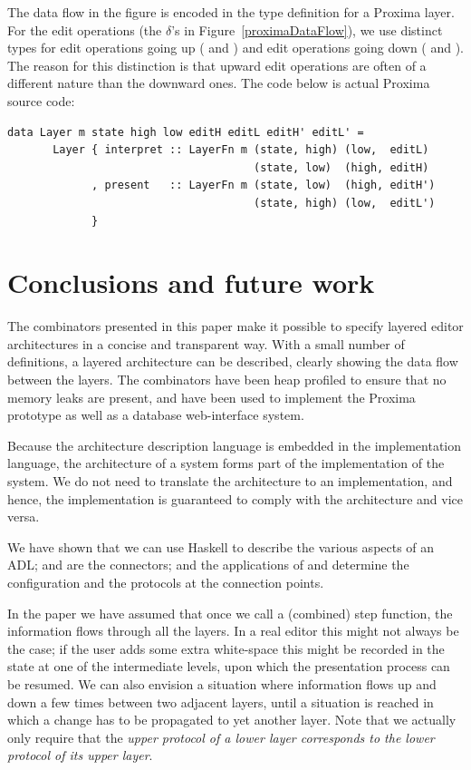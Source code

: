 \documentclass{llncs}
\begin{document}
The data flow in the figure is encoded in the type definition for a Proxima layer. For the edit operations (the $\delta$'s in Figure~\ref{proximaDataFlow}), we use distinct types for edit operations going up ( and ) and edit operations going down ( and ). The reason for this distinction is that upward edit operations are often of a different nature than the downward ones. The code below is actual Proxima source code:

\begin{small}
\begin{verbatim}
data Layer m state high low editH editL editH' editL' =
       Layer { interpret :: LayerFn m (state, high) (low,  editL)
                                      (state, low)  (high, editH)
             , present   :: LayerFn m (state, low)  (high, editH')
                                      (state, high) (low,  editL')
             }
\end{verbatim}
\end{small}


\section{Conclusions and future work} \label{sect:conclusions}

The combinators presented in this paper make it possible to specify layered editor architectures in a concise and transparent way. With a small number of definitions, a layered architecture can be described, clearly showing the data flow between the layers. The combinators have been heap profiled to ensure that no memory leaks are present, and have been used to implement the Proxima prototype as well as a database web-interface system.

Because the architecture description language is embedded in the implementation language, the architecture of a system forms part of the implementation of the system. We do not need to translate the architecture to an implementation, and hence, the implementation is guaranteed to comply with the architecture and vice versa.

We have shown that we can use Haskell to describe the various aspects of an ADL;  and  are the connectors; and the applications of  and  determine the configuration and the protocols at the connection points.

In the paper we have assumed that once we call a (combined) step function, the information flows through all the layers. In a real editor this might not always be the case; if the user adds some extra white-space this might be recorded in the state at one of the intermediate levels, upon which the presentation process can be resumed. We can also envision a situation where information flows up and down a few times between two adjacent layers, until a situation is reached in which a change has to be propagated to yet another layer. Note that we actually only require that the {\em upper protocol of a lower layer corresponds to the lower protocol of its upper layer}. 
\end{document}
